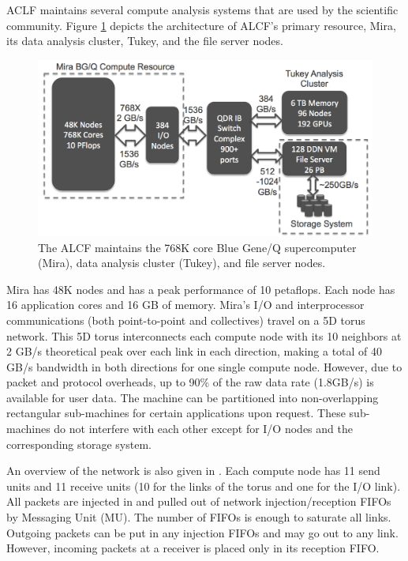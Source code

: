 \documentclass[final,5p,times]{elsarticle}
\begin{document}
ACLF maintains several compute analysis systems that are used by the scientific community. Figure \ref{fig:alcf} depicts the architecture of ALCF’s primary resource, Mira, its data analysis cluster, Tukey, and the file server nodes.

\begin{figure}[!htb]
\vspace{-0.1in}
\centering
\includegraphics[scale=0.2]{figures/anl_facility}
\vspace{-0.1in}
\caption{The ALCF maintains the 768K core Blue Gene/Q supercomputer (Mira), data analysis cluster (Tukey), and file server nodes.}
\vspace{-0.1in}
\label{fig:alcf}
\end{figure}

Mira has 48K nodes and has a peak performance of 10 petaflops. Each node has 16 application cores and 16 GB of memory.
Mira’s I/O and interprocessor communications (both point-to-point and collectives) travel on a 5D torus network. This 5D torus interconnects each compute node with its 10 neighbors at 2 GB/s theoretical peak over each link in each direction, making a total of 40 GB/s bandwidth in both directions for one single compute node. However, due to packet and protocol overheads, up to 90\% of the raw data rate (1.8GB/s) is available for user data. The machine can be partitioned into non-overlapping rectangular sub-machines for certain applications upon request. These sub-machines do not interfere with each other except for I/O nodes and the corresponding storage system.

An overview of the network is also given in \cite{Chen:MessagingUnit}. Each compute node has 11 send units and 11 receive units (10 for the links of the torus and one for the I/O link). All packets are injected in and pulled out of network injection/reception FIFOs by Messaging Unit (MU). The number of FIFOs is enough to saturate all links. Outgoing packets can be put in any injection FIFOs and may go out to any link. However, incoming packets at a receiver is placed only in its reception FIFO.
\end{document}
